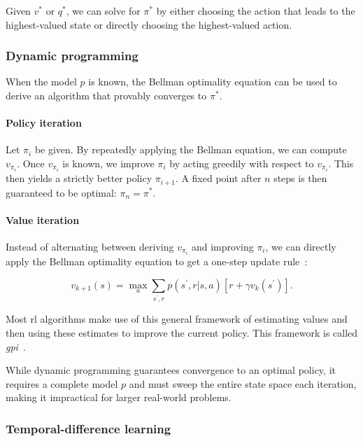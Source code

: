 Given $v^*$ or $q^*$, we can solve for $\pi^*$ by either choosing the action that leads
to the highest-valued state or directly choosing the highest-valued action.

\subsubsection{Dynamic programming}\label{sec:rl-dp}

When the model $p$ is known, the Bellman optimality equation can be used to derive an algorithm
that provably converges to $\pi^*$.

\paragraph{Policy iteration}
Let $\pi_i$ be given. By repeatedly applying the Bellman equation,
we can compute $v_{\pi_i}$. Once $v_{\pi_i}$ is known, we improve $\pi_i$ by acting greedily
with respect to $v_{\pi_i}$. This then yields a strictly better policy $\pi_{i+1}$.
A fixed point after $n$ steps is then guaranteed to be optimal: $\pi_n=\pi^*$.

\paragraph{Value iteration}
Instead of alternating between deriving $v_{\pi_i}$ and improving $\pi_i$, we can directly
apply the Bellman optimality equation to get a one-step update rule~\cite{puterman_markov_2009}:

\begin{equation}\label{eq:value-iteration}
  v_{k+1}(s)=\max_a\sum_{s^\prime,r}p(s^\prime,r|s,a)\left[r+\gamma v_k(s^\prime)\right].
\end{equation}

Most \gls{rl} algorithms make use of this general framework of estimating values and then
using these estimates to improve the current policy.
This framework is called \emph{\gls{gpi}}~\cite{sutton_reinforcement_2020}.

While dynamic programming guarantees convergence to an optimal policy, it requires a complete model $p$ and
must sweep the entire state space each iteration, making it impractical for larger real-world problems.

\subsubsection{Temporal-difference learning}\label{sec:rl-td}

